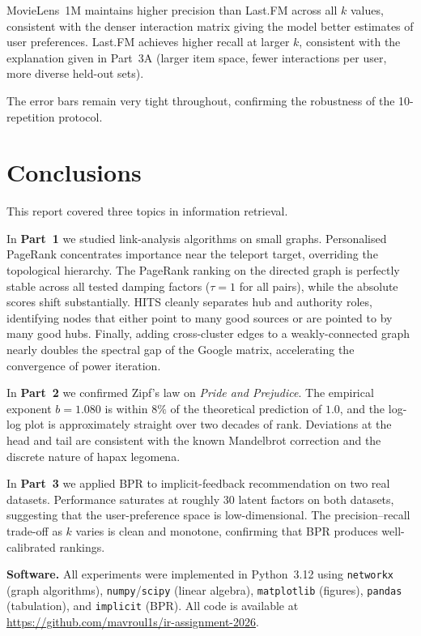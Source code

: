 \documentclass[12pt, a4paper]{article}
\begin{document}
MovieLens~1M maintains higher precision than Last.FM across all $k$
values, consistent with the denser interaction matrix giving the model
better estimates of user preferences.
Last.FM achieves higher recall at larger $k$, consistent with the
explanation given in Part~3A (larger item space, fewer interactions per
user, more diverse held-out sets).

The error bars remain very tight throughout, confirming the robustness
of the 10-repetition protocol.

\section{Conclusions}

This report covered three topics in information retrieval.

In \textbf{Part~1} we studied link-analysis algorithms on small graphs.
Personalised PageRank concentrates importance near the teleport target,
overriding the topological hierarchy. The PageRank ranking on the directed
graph is perfectly stable across all tested damping factors ($\tau=1$ for
all pairs), while the absolute scores shift substantially. HITS cleanly
separates hub and authority roles, identifying nodes that either point to
many good sources or are pointed to by many good hubs. Finally, adding
cross-cluster edges to a weakly-connected graph nearly doubles the spectral
gap of the Google matrix, accelerating the convergence of power iteration.

In \textbf{Part~2} we confirmed Zipf's law on \textit{Pride and Prejudice}.
The empirical exponent $b = 1.080$ is within $8\%$ of the theoretical
prediction of $1.0$, and the log-log plot is approximately straight over
two decades of rank. Deviations at the head and tail are consistent with
the known Mandelbrot correction and the discrete nature of hapax legomena.

In \textbf{Part~3} we applied BPR to implicit-feedback recommendation on
two real datasets. Performance saturates at roughly 30 latent factors on
both datasets, suggesting that the user-preference space is low-dimensional.
The precision--recall trade-off as $k$ varies is clean and monotone,
confirming that BPR produces well-calibrated rankings.

\textbf{Software.} All experiments were implemented in Python~3.12 using
\texttt{networkx} (graph algorithms), \texttt{numpy}/\texttt{scipy}
(linear algebra), \texttt{matplotlib} (figures), \texttt{pandas}
(tabulation), and \texttt{implicit} (BPR).
All code is available at
\url{https://github.com/mavroul1s/ir-assignment-2026}.



\end{document}
